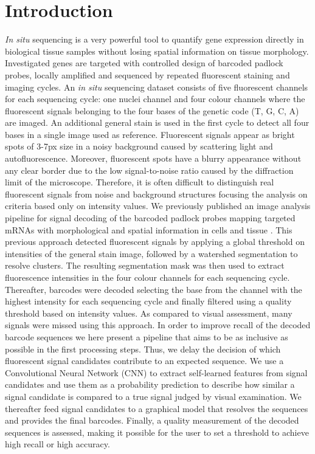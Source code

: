 \documentclass[10pt,journal]{IEEEtran}
\begin{document}
\section{Introduction}
\textit{In situ} sequencing \cite{ke2013situ} is a very powerful tool to quantify gene expression directly in biological tissue samples without losing spatial information on tissue morphology. Investigated genes are targeted with controlled design of barcoded padlock probes, locally amplified and sequenced by repeated fluorescent staining and imaging cycles.
An \textit{in situ} sequencing dataset consists of five fluorescent channels for each sequencing cycle: one nuclei channel and four colour channels where the fluorescent signals belonging to the four bases of the genetic code (T, G, C, A) are imaged.
An additional general stain is used in the first cycle to detect all four bases in a single image used as reference.
Fluorescent signals appear as bright spots of 3-7px size in a noisy background caused by scattering light and autofluorescence. Moreover, fluorescent spots have a blurry appearance without any clear border due to the low signal-to-noise ratio caused by the diffraction limit of the microscope. Therefore, it is often difficult to distinguish real fluorescent signals from noise and background structures focusing the analysis on criteria based only on intensity values.
We previously published an image analysis pipeline for signal decoding of the barcoded padlock probes mapping targeted mRNAs with morphological and spatial information in cells and tissue \cite{pacureanu2014image}.
This previous approach detected fluorescent signals by applying a global threshold on intensities of the general stain image, followed by a watershed segmentation to resolve clusters. The resulting segmentation mask was then used to extract fluorescence intensities in the four colour channels for each sequencing cycle. Thereafter, barcodes were decoded selecting the base from the channel with the highest intensity for each sequencing cycle and finally filtered using a quality threshold based on intensity values.
As compared to visual assessment, many signals were missed using this approach.
In order to improve recall of the decoded barcode sequences we here present a pipeline that aims to be as inclusive as possible in the first processing steps. Thus, we delay the decision of which fluorescent signal candidates contribute to an expected sequence.
We use a Convolutional Neural Network (CNN) to extract self-learned features from signal candidates and use them as a probability prediction to describe how similar a signal candidate is compared to a true signal judged by visual examination. We thereafter feed signal candidates to a graphical model that resolves the sequences and provides the final barcodes. Finally, a quality measurement of the decoded sequences is assessed, making it possible for the user to set a threshold to achieve high recall or high accuracy.
\end{document}
